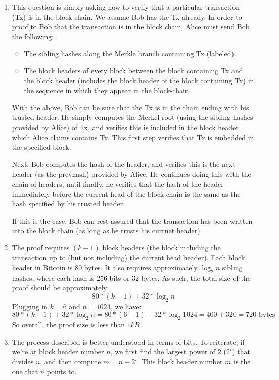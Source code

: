 \documentclass[12pt]{exam}
\newcommand{\Q}[1]{\question{\large{\textbf{#1}}}}
\begin{document}
\begin{questions}
\newpage
\Q{Lightweight clients}
\begin{solution}
\begin{enumerate}[label=\textbf{\alph*.}]
  \item
    This question is simply asking how to verify that a particular transaction (Tx) is in the block chain. We assume Bob has the Tx already. In order to proof to Bob that the transaction is in the block chain, Alice must send Bob the following:
    \begin{itemize}
      \item The sibling hashes along the Merkle branch containing Tx (labeled).
      \item The block headers of every block between the block containing Tx and the block header (includes the block header of the block containing Tx) in the sequence in which they appear in the block-chain.
    \end{itemize}
    With the above, Bob can be sure that the Tx is in the chain ending with his trusted header. He simply computes the Merkel root (using the sibling hashes provided by Alice) of Tx, and verifies this is included in the block header which Alice claims contains Tx. This first step verifies that Tx is embedded in the specified block.

    Next, Bob computes the hash of the header, and verifies this is the next header (as the prevhash) provided by Alice. He continues doing this with the chain of headers, until finally, he verifies that the hash of the header immediately before the current head of the block-chain is the same as the hash specified by his trusted header.

    If this is the case, Bob can rest assured that the transaction has been written into the block chain (as long as he trusts his currnet header).

  \item
    The proof requires $(k-1)$ block headers (the block including the transaction up to (but not including) the current head header). Each block header in Bitcoin is $80$ bytes. It also requires approximately $\log_2 n$ sibling hashes, where each hash is $256$ bits or $32$ bytes. As such, the total size of the proof should be approximately:
    \[
      80*(k-1) + 32*\log_2 n
    \]
    Plugging in $k = 6$ and $n = 1024$, we have:
    \[
      80*(k-1) + 32*\log_2 n = 80*(6-1) + 32 * \log_2 1024 = 400 + 320 = 720 \text{ bytes }
    \]
    So overall, the proof size is less than $1kB$.

  \item
    The process described is better understood in terms of bits. To reiterate, if we're at block header number $n$, we first find the largest power of $2$ ($2^i$) that divides $n$, and then compute $m = n - 2^i$. This block header number $m$ is the one that $n$ points to.


\end{enumerate}
\end{solution}
\end{questions}
\end{document}
